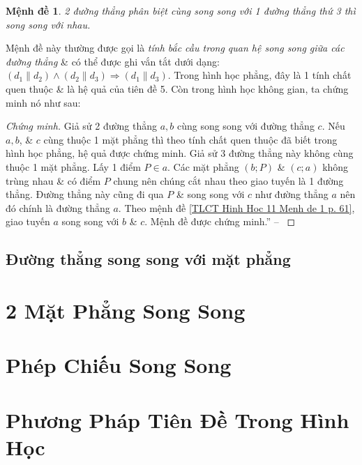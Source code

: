 \documentclass[oneside]{book}
\numberwithin{equation}{section}
\newtheorem{menhde}{Mệnh đề}[section]
\begin{document}
\begin{menhde}
	2 đường thẳng phân biệt cùng song song với 1 đường thẳng thứ 3 thì song song với nhau.
\end{menhde}
Mệnh đề này thường được gọi là \textit{tính bắc cầu trong quan hệ song song giữa các đường thẳng} \& có thể được ghi vắn tắt dưới dạng: $(d_1\parallel d_2)\land(d_2\parallel d_3)\Rightarrow(d_1\parallel d_3)$. Trong hình học phẳng, đây là 1 tính chất quen thuộc \& là hệ quả của tiên đề 5. Còn trong hình học không gian, ta chứng minh nó như sau:

\begin{proof}[Chứng minh]
	Giả sử 2 đường thẳng $a,b$ cùng song song với đường thẳng $c$. Nếu $a,b$, \& $c$ cùng thuộc 1 mặt phẳng thì theo tính chất quen thuộc đã biết trong hình học phẳng, hệ quả được chứng minh. Giả sử 3 đường thẳng này không cùng thuộc 1 mặt phẳng. Lấy 1 điểm $P\in a$. Các mặt phẳng $(b;P)$ \& $(c;a)$ không trùng nhau \& có điểm $P$ chung nên chúng cắt nhau theo giao tuyến là 1 đường thẳng. Đường thẳng này cũng đi qua $P$ \& song song với $c$ như đường thẳng $a$ nên đó chính là đường thẳng $a$. Theo mệnh đề \ref{TLCT Hinh Hoc 11 Menh de 1 p. 61}, giao tuyến $a$ song song với $b$ \& $c$. Mệnh đề được chứng minh.'' -- \cite[pp. 60--62]{TL_chuyen_Toan_Hinh_Hoc_11}
\end{proof}

\subsection{Đường thẳng song song với mặt phẳng}


\section{2 Mặt Phẳng Song Song}


\section{Phép Chiếu Song Song}


\section{Phương Pháp Tiên Đề Trong Hình Học}
\end{document}
